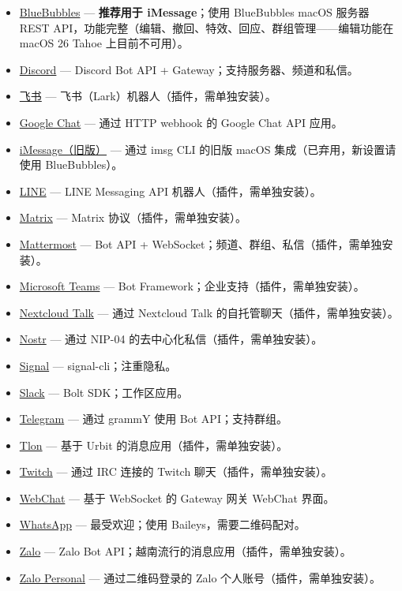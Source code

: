 \begin{itemize}
  \item \href{/channels/bluebubbles}{BlueBubbles} — \textbf{推荐用于 iMessage}；使用 BlueBubbles macOS 服务器 REST API，功能完整（编辑、撤回、特效、回应、群组管理——编辑功能在 macOS 26 Tahoe 上目前不可用）。
  \item \href{/channels/discord}{Discord} — Discord Bot API + Gateway；支持服务器、频道和私信。
  \item \href{/channels/feishu}{飞书} — 飞书（Lark）机器人（插件，需单独安装）。
  \item \href{/channels/googlechat}{Google Chat} — 通过 HTTP webhook 的 Google Chat API 应用。
  \item \href{/channels/imessage}{iMessage（旧版）} — 通过 imsg CLI 的旧版 macOS 集成（已弃用，新设置请使用 BlueBubbles）。
  \item \href{/channels/line}{LINE} — LINE Messaging API 机器人（插件，需单独安装）。
  \item \href{/channels/matrix}{Matrix} — Matrix 协议（插件，需单独安装）。
  \item \href{/channels/mattermost}{Mattermost} — Bot API + WebSocket；频道、群组、私信（插件，需单独安装）。
  \item \href{/channels/msteams}{Microsoft Teams} — Bot Framework；企业支持（插件，需单独安装）。
  \item \href{/channels/nextcloud-talk}{Nextcloud Talk} — 通过 Nextcloud Talk 的自托管聊天（插件，需单独安装）。
  \item \href{/channels/nostr}{Nostr} — 通过 NIP-04 的去中心化私信（插件，需单独安装）。
  \item \href{/channels/signal}{Signal} — signal-cli；注重隐私。
  \item \href{/channels/slack}{Slack} — Bolt SDK；工作区应用。
  \item \href{/channels/telegram}{Telegram} — 通过 grammY 使用 Bot API；支持群组。
  \item \href{/channels/tlon}{Tlon} — 基于 Urbit 的消息应用（插件，需单独安装）。
  \item \href{/channels/twitch}{Twitch} — 通过 IRC 连接的 Twitch 聊天（插件，需单独安装）。
  \item \href{/web/webchat}{WebChat} — 基于 WebSocket 的 Gateway 网关 WebChat 界面。
  \item \href{/channels/whatsapp}{WhatsApp} — 最受欢迎；使用 Baileys，需要二维码配对。
  \item \href{/channels/zalo}{Zalo} — Zalo Bot API；越南流行的消息应用（插件，需单独安装）。
  \item \href{/channels/zalouser}{Zalo Personal} — 通过二维码登录的 Zalo 个人账号（插件，需单独安装）。
\end{itemize}


